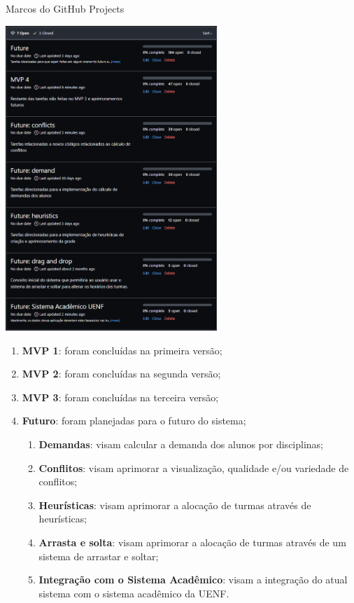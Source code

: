 \begin{MyCenteredFigure} \caption{Marcos do GitHub Projects} \label{fig:ProjectsMilestones}
  \includegraphics[width=0.6\textwidth]{files/img/2.02!5-desenvolvimento/2.02!5.1.4-sistema/GitHubProjects-Open_Milestones}
\end{MyCenteredFigure}

\begin{enumerate}
  \item \textbf{MVP 1}: foram concluídas na primeira versão;
  \item \textbf{MVP 2}: foram concluídas na segunda versão;
  \item \textbf{MVP 3}: foram concluídas na terceira versão;
  \item \textbf{Futuro}: foram planejadas para o futuro do sistema;
        \begin{enumerate}
          \item \textbf{Demandas}: visam calcular a demanda dos alunos por disciplinas;
          \item \textbf{Conflitos}: visam aprimorar a visualização, qualidade e/ou variedade de conflitos;
          \item \textbf{Heurísticas}: visam aprimorar a alocação de turmas através de heurísticas;
          \item \textbf{Arrasta e solta}: visam aprimorar a alocação de turmas através de um sistema de arrastar e soltar;
          \item \textbf{Integração com o Sistema Acadêmico}: visam a integração do atual sistema com o sistema acadêmico da UENF.
        \end{enumerate}
\end{enumerate}

